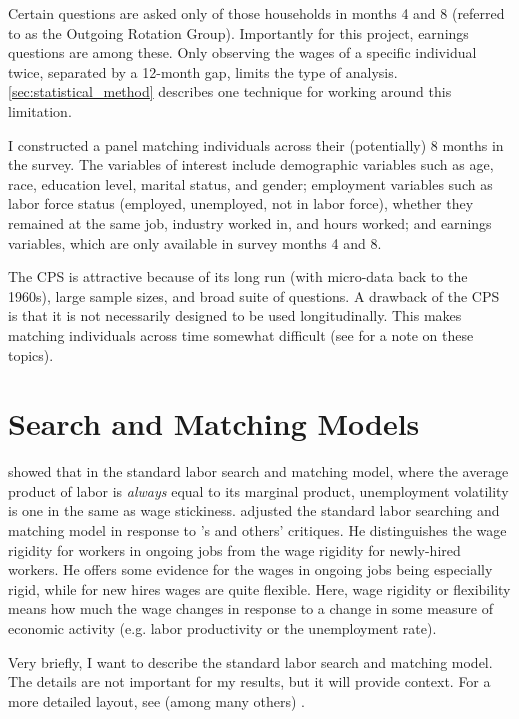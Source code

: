 \documentclass[11pt]{article}
\begin{document}
Certain questions are asked only of those households in months 4 and 8 (referred to as the Outgoing Rotation Group).
Importantly for this project, earnings questions are among these.
Only observing the wages of a specific individual twice, separated by a 12-month gap, limits the type of analysis.
\autoref{sec:statistical_method} describes one technique for working around this limitation.

I constructed a panel matching individuals across their (potentially) 8 months in the survey.
The variables of interest include demographic variables such as age, race, education level, marital status, and gender;
employment variables such as labor force status (employed, unemployed, not in labor force), whether they remained at the same job, industry worked in, and hours worked;
and earnings variables, which are only available in survey months 4 and 8.

The CPS is attractive because of its long run (with micro-data back to the 1960s), large sample sizes, and broad suite of questions.
A drawback of the CPS is that it is not necessarily designed to be used longitudinally.
This makes matching individuals across time somewhat difficult (see \cite{madrian1999note} for a note on these topics).


\section{Search and Matching Models}
\label{sec:search_and_matching_models}

\cite{hall_milgrom_2008} showed that in the standard labor search and matching model, where the average product of labor is \emph{always} equal to its marginal product, unemployment volatility is one in the same as wage stickiness.
\cite{pissarides_2009} adjusted the standard labor searching and matching model in response to \cite{shimer_2005}'s and others' critiques.
He distinguishes the wage rigidity for workers in ongoing jobs from the wage rigidity for newly-hired workers.
He offers some evidence for the wages in ongoing jobs being especially rigid, while for new hires wages are quite flexible.
Here, wage rigidity or flexibility means how much the wage changes in response to a change in some measure of economic activity (e.g. labor productivity or the unemployment rate).

Very briefly, I want to describe the standard labor search and matching model.
The details are not important for my results, but it will provide context.
For a more detailed layout, see (among many others) \cite{pissarides_2009}.
\end{document}
